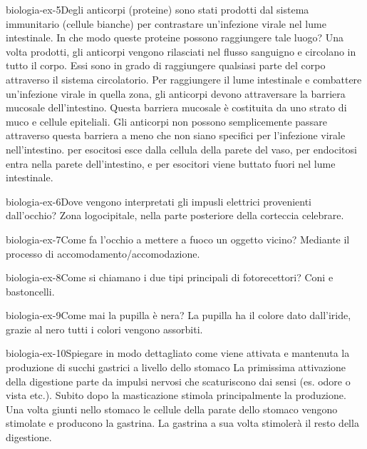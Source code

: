 \documentclass[preview]{standalone}
\begin{document}
\begin{snippetexercise}{biologia-ex-5}{Degli anticorpi (proteine) sono stati prodotti dal sistema immunitario (cellule bianche) per contrastare un'infezione virale nel lume intestinale. In che modo queste proteine possono raggiungere tale luogo?}
    Una volta prodotti, gli anticorpi vengono rilasciati nel flusso sanguigno e circolano in tutto il corpo. Essi sono in grado di raggiungere qualsiasi parte del corpo attraverso il sistema circolatorio.
    Per raggiungere il lume intestinale e combattere un'infezione virale in quella zona, gli anticorpi devono attraversare la barriera mucosale dell'intestino. Questa barriera mucosale è costituita da uno strato di muco e cellule epiteliali. Gli anticorpi non possono semplicemente passare attraverso questa barriera a meno che non siano specifici per l'infezione virale nell'intestino.
    per esocitosi esce dalla cellula della parete del vaso, per endocitosi entra nella parete dell'intestino, e per esocitori viene buttato fuori nel lume intestinale.
\end{snippetexercise}

\begin{snippetexercise}{biologia-ex-6}{Dove vengono interpretati gli impusli elettrici provenienti dall'occhio?}
    Zona logocipitale, nella parte posteriore della corteccia celebrare.
\end{snippetexercise}

\begin{snippetexercise}{biologia-ex-7}{Come fa l'occhio a mettere a fuoco un oggetto vicino?}
    Mediante il processo di accomodamento/accomodazione.
\end{snippetexercise}

\begin{snippetexercise}{biologia-ex-8}{Come si chiamano i due tipi principali di fotorecettori?}
    Coni e bastoncelli.
\end{snippetexercise}

\begin{snippetexercise}{biologia-ex-9}{Come mai la pupilla è nera?}
    La pupilla ha il colore dato dall'iride,
    grazie al nero tutti i colori vengono assorbiti.
\end{snippetexercise}

\begin{snippetexercise}{biologia-ex-10}{Spiegare in modo dettagliato come viene attivata e mantenuta la produzione di succhi gastrici a
    livello dello stomaco}
    La primissima attivazione della digestione parte da impulsi nervosi che scaturiscono dai sensi
    (es. odore o vista etc.).
    Subito dopo la masticazione stimola principalmente la produzione.
    Una volta giunti nello stomaco le cellule della parate dello stomaco vengono stimolate e producono la gastrina.
    La gastrina a sua volta stimolerà il resto della digestione.
\end{snippetexercise}
\end{document}
